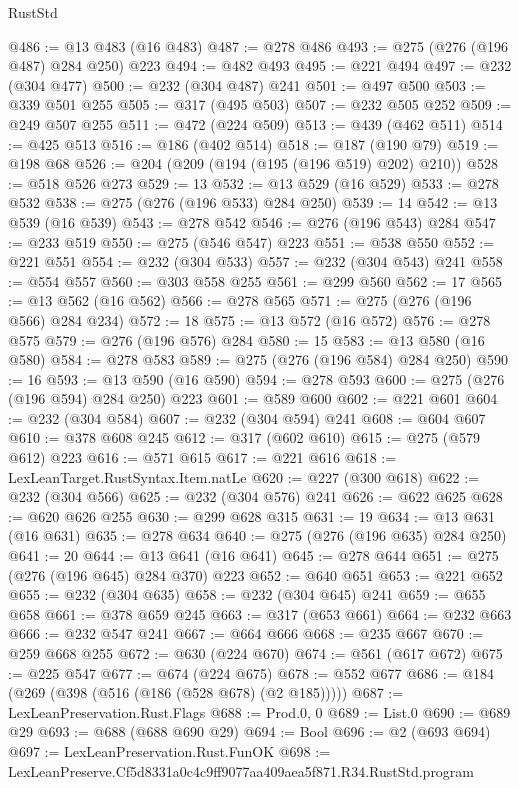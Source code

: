 \begin{lexlean}{RustStd}
\begin{coremodule}
@486 := @13 @483 (@16 @483)
@487 := @278 @486
@493 := @275 (@276 (@196 @487) @284 @250) @223
@494 := @482 @493
@495 := @221 @494
@497 := @232 (@304 @477)
@500 := @232 (@304 @487) @241
@501 := @497 @500
@503 := @339 @501 @255
@505 := @317 (@495 @503)
@507 := @232 @505 @252
@509 := @249 @507 @255
@511 := @472 (@224 @509)
@513 := @439 (@462 @511)
@514 := @425 @513
@516 := @186 (@402 @514)
@518 := @187 (@190 @79)
@519 := @198 @68
@526 := @204 (@209 (@194 (@195 (@196 @519) @202) @210))
@528 := @518 @526 @273
@529 := 13
@532 := @13 @529 (@16 @529)
@533 := @278 @532
@538 := @275 (@276 (@196 @533) @284 @250)
@539 := 14
@542 := @13 @539 (@16 @539)
@543 := @278 @542
@546 := @276 (@196 @543) @284
@547 := @233 @519
@550 := @275 (@546 @547) @223
@551 := @538 @550
@552 := @221 @551
@554 := @232 (@304 @533)
@557 := @232 (@304 @543) @241
@558 := @554 @557
@560 := @303 @558 @255
@561 := @299 @560
@562 := 17
@565 := @13 @562 (@16 @562)
@566 := @278 @565
@571 := @275 (@276 (@196 @566) @284 @234)
@572 := 18
@575 := @13 @572 (@16 @572)
@576 := @278 @575
@579 := @276 (@196 @576) @284
@580 := 15
@583 := @13 @580 (@16 @580)
@584 := @278 @583
@589 := @275 (@276 (@196 @584) @284 @250)
@590 := 16
@593 := @13 @590 (@16 @590)
@594 := @278 @593
@600 := @275 (@276 (@196 @594) @284 @250) @223
@601 := @589 @600
@602 := @221 @601
@604 := @232 (@304 @584)
@607 := @232 (@304 @594) @241
@608 := @604 @607
@610 := @378 @608 @245
@612 := @317 (@602 @610)
@615 := @275 (@579 @612) @223
@616 := @571 @615
@617 := @221 @616
@618 := LexLeanTarget.RustSyntax.Item.natLe
@620 := @227 (@300 @618)
@622 := @232 (@304 @566)
@625 := @232 (@304 @576) @241
@626 := @622 @625
@628 := @620 @626 @255
@630 := @299 @628 @315
@631 := 19
@634 := @13 @631 (@16 @631)
@635 := @278 @634
@640 := @275 (@276 (@196 @635) @284 @250)
@641 := 20
@644 := @13 @641 (@16 @641)
@645 := @278 @644
@651 := @275 (@276 (@196 @645) @284 @370) @223
@652 := @640 @651
@653 := @221 @652
@655 := @232 (@304 @635)
@658 := @232 (@304 @645) @241
@659 := @655 @658
@661 := @378 @659 @245
@663 := @317 (@653 @661)
@664 := @232 @663
@666 := @232 @547 @241
@667 := @664 @666
@668 := @235 @667
@670 := @259 @668 @255
@672 := @630 (@224 @670)
@674 := @561 (@617 @672)
@675 := @225 @547
@677 := @674 (@224 @675)
@678 := @552 @677
@686 := @184 (@269 (@398 (@516 (@186 (@528 @678) (@2 @185)))))
@687 := LexLeanPreservation.Rust.Flags
@688 := Prod.{0, 0}
@689 := List.{0}
@690 := @689 @29
@693 := @688 (@688 @690 @29)
@694 := Bool
@696 := @2 (@693 @694)
@697 := LexLeanPreservation.Rust.FunOK
@698 := LexLeanPreserve.Cf5d8331a0c4c9ff9077aa409aea5f871.R34.RustStd.program

\end{coremodule}
\end{lexlean}
